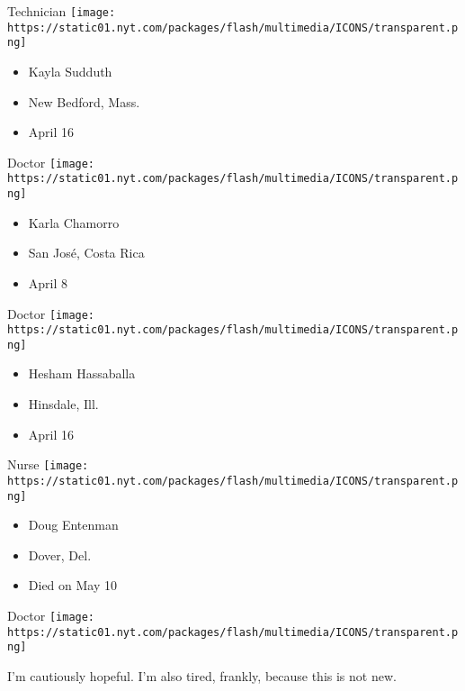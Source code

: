 \protect\hyperlink{item-kayla-sudduth}{}

Technician
\texttt{[image: https://static01.nyt.com/packages/flash/multimedia/ICONS/transparent.png]}

\begin{itemize}
\tightlist
\item
  Kayla Sudduth
\item
  New Bedford, Mass.
\item
  April 16
\end{itemize}

\protect\hyperlink{item-karla-chamorro}{}

Doctor
\texttt{[image: https://static01.nyt.com/packages/flash/multimedia/ICONS/transparent.png]}

\begin{itemize}
\tightlist
\item
  Karla Chamorro
\item
  San José, Costa Rica
\item
  April 8
\end{itemize}

\protect\hyperlink{item-hesham-hassaballa}{}

Doctor
\texttt{[image: https://static01.nyt.com/packages/flash/multimedia/ICONS/transparent.png]}

\begin{itemize}
\tightlist
\item
  Hesham Hassaballa
\item
  Hinsdale, Ill.
\item
  April 16
\end{itemize}

\protect\hyperlink{item-doug-entenman}{}

Nurse
\texttt{[image: https://static01.nyt.com/packages/flash/multimedia/ICONS/transparent.png]}

\begin{itemize}
\tightlist
\item
  Doug Entenman
\item
  Dover, Del.
\item
  Died on May 10
\end{itemize}

\protect\hyperlink{item-chinazo-cunningham}{}

Doctor
\texttt{[image: https://static01.nyt.com/packages/flash/multimedia/ICONS/transparent.png]}

I'm cautiously hopeful. I'm also tired, frankly, because this is not
new.


